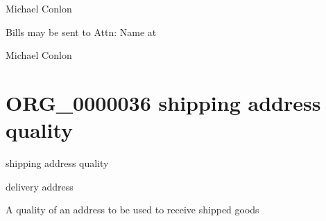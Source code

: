 \documentclass[letterpaper,10pt,english]{sphinxmanual}
\begin{document}
\begin{sphinxShadowBox}

\sphinxAtStartPar
Michael Conlon 
\end{sphinxShadowBox}

\begin{sphinxShadowBox}

\sphinxAtStartPar
Bills may be sent to Attn: Name at
\end{sphinxShadowBox}

\begin{sphinxShadowBox}

\sphinxAtStartPar
Michael Conlon 
\end{sphinxShadowBox}
\begin{quote}
\label{\detokenize{doc-ORG_0000036:org-0000036}}\label{\detokenize{doc-ORG_0000036:shipping-address-quality}}\label{\detokenize{doc-ORG_0000036:org-0000036}}
\ignorespaces \end{quote}


\section{ORG\_0000036 \sphinxhyphen{} shipping address quality}
\label{\detokenize{doc-ORG_0000036:org-0000036-shipping-address-quality}}\label{\detokenize{doc-ORG_0000036:index-0}}\label{\detokenize{doc-ORG_0000036::doc}}
\begin{sphinxShadowBox}

\sphinxAtStartPar
shipping address quality
\end{sphinxShadowBox}

\begin{sphinxShadowBox}

\sphinxAtStartPar
delivery address
\end{sphinxShadowBox}

\begin{sphinxShadowBox}

\sphinxAtStartPar
A quality of an address to be used to receive shipped goods
\end{sphinxShadowBox}
\end{document}
